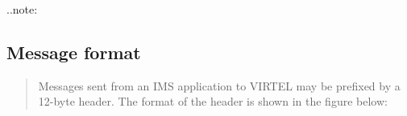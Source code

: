 \documentclass[letterpaper,10pt,english]{sphinxmanual}
\begin{document}

..note:

\begin{sphinxVerbatim}[commandchars=\\\{\}]
           
\end{sphinxVerbatim}

\ignorespaces 

\subsection{Message format}
\label{\detokenize{connectivity_guide:message-format}}\label{\detokenize{connectivity_guide:index-27}}\begin{quote}

Messages sent from an IMS application to VIRTEL may be prefixed by a 12-byte header. The format of the header is shown in the figure below:
\end{quote}
\end{document}
